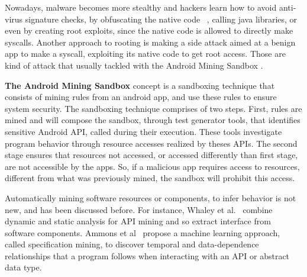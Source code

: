 Nowadays, malware becomes more stealthy and hackers learn how to avoid anti-virus signature checks, by obfuscating the native code~\cite{DBLP:journals/corr/abs-2002-04540}
, calling java libraries, or even by creating root exploits, since the native code is allowed to directly make syscalls. Another approach to rooting is making a side attack aimed at a benign app to make a syscall, exploiting its native code to get root access. Those are kind of attack that usually tackled with the Android Mining Sandbox \cite{DBLP:conf/icse/JamrozikSZ16}.


\textbf{The Android Mining Sandbox} concept is a sandboxing technique that consists of mining rules from an android app, and use these rules to ensure system security. The sandboxing technique comprises of two steps. First, rules are mined and will compose the sandbox,
through test generator tools, that identifies sensitive Android API, called during their execution. 
These tools investigate program behavior through resource accesses realized by theses APIs. The second stage ensures that resources not accessed, or accessed differently than first stage, are not accessible by the apps. So, if a malicious app requires access to resources, different from what was previously mined, the sandbox will prohibit this access.

Automatically mining software resources or components, to infer behavior is not new, and has been discussed before. For instance, Whaley et al.~\cite{DBLP:conf/issta/WhaleyML02} combine dynamic and static analysis for API mining and so extract interface from software components. Ammons et al~\cite{DBLP:conf/popl/AmmonsBL02} propose a machine learning
approach, called specification mining, to discover temporal and data-dependence relationships that a program follows when interacting with an API or abstract data type.

